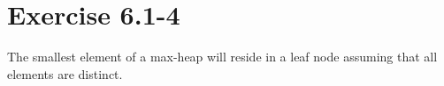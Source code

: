 \documentclass{article}
\begin{document}
\section*{Exercise 6.1-4}

The smallest element of a max-heap will reside in a leaf node assuming that all elements are distinct.
\end{document}
